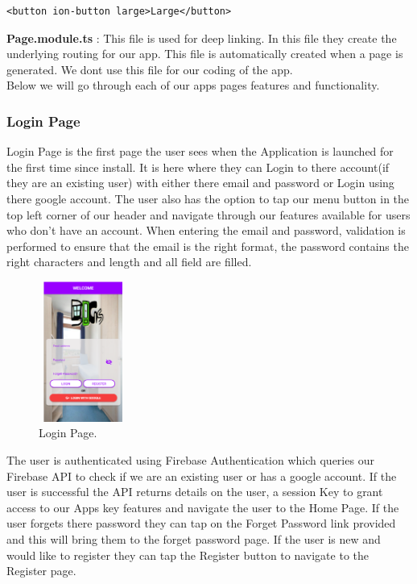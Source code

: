 \begin{verbatim}
<button ion-button large>Large</button>
\end{verbatim}

\noindent \textbf{Page.module.ts} : This file is used for deep linking. In this file they create the underlying routing for our app.\cite{https://ionicframework.com/docs/api/IonicPageModule/} This file is automatically created when a page is generated. We dont use this file for our coding of the app.\\

\noindent Below we will go through each of our apps pages features and functionality.

\subsubsection{Login Page}

Login Page is the first page the user sees when the Application is launched for the first time since install. It is here where they can Login to there account(if they are an existing user) with either there email and password or Login using there google account. The user also has the option to tap our menu button in the top left corner of our header and navigate through our features available for users who don’t have an account.  When entering the email and password, validation is performed to ensure that the email is the right format, the password contains the right characters and length and all field are filled.  

\begin{figure}[h]
\centering
\includegraphics[width=2.9cm, height=4.6cm]{img/Login}
\caption{Login Page.}
\end{figure}

\noindent The user is authenticated using Firebase Authentication which queries our Firebase API to check if we are an existing user or has a google account. If the user is successful the API returns details on the user, a session Key to grant access to our Apps key features and navigate the user to the Home Page. If the user forgets there password they can tap on the Forget Password link provided and this will bring them to the forget password page. If the user is new and would like to register they can tap the Register button to navigate to the Register page. 

